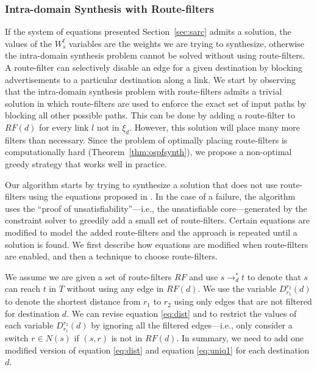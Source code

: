 \subsubsection{Intra-domain Synthesis with Route-filters} \label{sec:routefilter}

If the system of equations presented Section~\ref{sec:sarc} admits a solution, 
the values of the $W_s^t$ variables are the weights we are trying to synthesize,
otherwise the intra-domain synthesis problem cannot be solved without using route-filters.
A route-filter  can selectively disable an
edge for a given destination by  blocking advertisements to a
particular destination along a link.
We start by observing that the intra-domain synthesis problem with route-filters
admits a trivial solution in which 
route-filters are used to enforce the exact set of input paths by blocking all other possible paths.
This can be done by adding a 
route-filter to $RF(d)$ for every link $l$ not in $\xi_d$. 
However, this solution will place many more filters than necessary.
Since the problem of optimally placing route-filters is computationally hard (Theorem~\ref{thm:ospfsynth}), 
we propose a non-optimal greedy strategy that works well in practice.

Our algorithm starts by trying to synthesize a solution
that does not use route-filters using the equations proposed in . 
In the case of a failure, the algorithm uses the ``proof of unsatisfiability''---i.e., the unsatisfiable core---generated by 
the constraint solver 
to greedily add a small set of route-filters. 
Certain equations are modified to model the added route-filters and the approach is repeated until a solution is found.
We first describe how  
equations are modified when
route-filters are enabled, and then a
technique to choose route-filters. 

We assume we are given a set of route-filters $RF$ and 
use $s\rightarrow_d^* t$ to denote that $s$ can reach $t$
in $T$ without using any edge in $RF(d)$.
We use the variable $D_{r_1}^{r_2}(d)$ to denote the shortest distance from $r_1$ to $r_2$
using only edges that are not filtered for destination $d$.
We can revise equation \eqref{eq:dist} and   to restrict the values of 
each variable $D_{r_1}^{r_2}(d)$
by  ignoring all the filtered edges---i.e., only consider a switch $r\in N(s)$ if
$(s,r)$ is not in $RF(d)$. 
In summary, we need to add one modified version of equation \eqref{eq:dist} 
and equation  \eqref{eq:uniq1} for each destination $d$.

